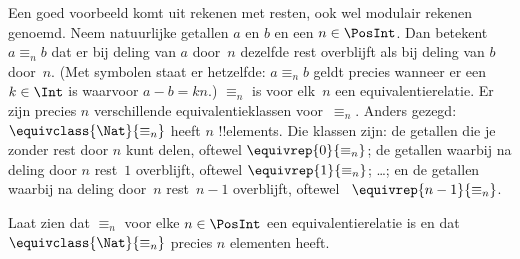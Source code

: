 \documentclass[../../../include/open-logic-section]{subfiles}
\begin{document}
\begin{ex}
Een goed voorbeeld komt uit rekenen met resten, ook wel modulair rekenen
genoemd. Neem natuurlijke getallen $a$ en $b$ en een $n \in \PosInt$.
Dan betekent $a \equiv_n b$ dat
er bij deling van $a$ door~$n$ dezelfde rest overblijft als bij deling
van $b$ door~$n$. (Met symbolen staat er hetzelfde: $a \equiv_n b$ geldt
precies wanneer er een $k \in \Int$ is waarvoor $a - b = kn$.)
$\equiv_n$ is voor elk~$n$ een equivalentierelatie. Er zijn precies $n$
verschillende equivalentieklassen voor~$\equiv_n$. Anders gezegd:
$\equivclass{\Nat}{\equiv_n}$ heeft $n$ !!{element}s. Die klassen zijn:
de getallen die je zonder rest door $n$ kunt delen, oftewel
$\equivrep{0}{\equiv_n}$; de getallen waarbij na deling door $n$ rest~$1$
overblijft, oftewel $\equivrep{1}{\equiv_n}$; \ldots; en de getallen
waarbij na deling door~$n$ rest~$n-1$ overblijft, oftewel
~$\equivrep{n-1}{\equiv_n}$.
\end{ex}

\begin{prob}
Laat zien dat $\equiv_n$ voor elke $n \in \PosInt$ een
equivalentierelatie is en dat $\equivclass{\Nat}{\equiv_n}$ precies
$n$ elementen heeft.
\end{prob}
\end{document}
